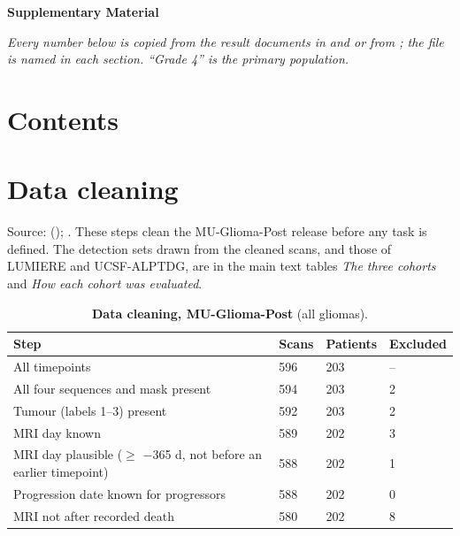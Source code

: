 \documentclass[11pt,a4paper]{article}
\begin{document}
\linenumbers

\begin{flushleft}
{\Large\bfseries Supplementary Material\par}
\vspace{0.8em}
{\large\bfseries \papertitle\par}
\end{flushleft}

\emph{Every number below is copied from the result documents in  and
 or from ; the file is named in each section. ``Grade 4'' is the
primary population.}

\section*{Contents}
\makeatletter{}\makeatother

\FloatBarrier
\section{Data cleaning}\label{sec:S2}

Source:  (); .
These steps clean the MU-Glioma-Post release \citep{mahmoud2025,yaseen2025tcia} before any task is defined. The detection sets drawn from the
cleaned scans, and those of LUMIERE and UCSF-ALPTDG, are in the main text tables \emph{The three cohorts} and \emph{How each cohort was evaluated}.

\begin{table}[H]
\centering
\small
\renewcommand{\thetable}{S1}\renewcommand{\theHtable}{S1}
\caption{\textbf{Data cleaning, MU-Glioma-Post} (all gliomas).}
\label{tab:S1a}
\begin{tabularx}{\linewidth}{@{}L R{0.88cm} R{1.40cm} R{1.40cm}@{}}
\toprule
Step & Scans & Patients & Excluded \\
\midrule
All timepoints & 596 & 203 & -- \\
All four sequences and mask present & 594 & 203 & 2 \\
Tumour (labels 1--3) present & 592 & 203 & 2 \\
MRI day known & 589 & 202 & 3 \\
MRI day plausible ($\geq$ $-$365 d, not before an earlier timepoint) & 588 & 202 & 1 \\
Progression date known for progressors & 588 & 202 & 0 \\
MRI not after recorded death & 580 & 202 & 8 \\
\bottomrule
\end{tabularx}
\end{table}
\end{document}
